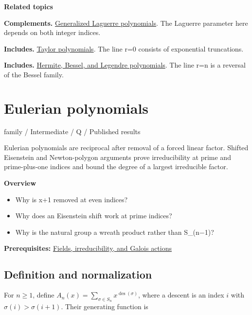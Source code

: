 \documentclass[11pt,a4paper,oneside,openany]{book}
\begin{document}
\par\medskip\begingroup\footnotesize\setlength{\parskip}{1pt}\textbf{\sffamily\color{atlasgreen}Related topics}\par
\color{black}\textbf{Complements.} \hyperlink{article:laguerre}{Generalized Laguerre polynomials}. The Laguerre parameter here depends on both integer indices.\par
\color{black}\textbf{Includes.} \hyperlink{article:taylor}{Taylor polynomials}. The line r=0 consists of exponential truncations.\par
\color{black}\textbf{Includes.} \hyperlink{article:orthogonal-families}{Hermite, Bessel, and Legendre polynomials}. The line r=n is a reversal of the Bessel family.\par
\endgroup
\chapter{Eulerian polynomials}\label{article:eulerian}\hypertarget{article:eulerian}{}\color{black}
{\sffamily\small\color{atlasgold}family / Intermediate / Q / Published results}\par\medskip
Eulerian polynomials are reciprocal after removal of a forced linear factor. Shifted Eisenstein and Newton-polygon arguments prove irreducibility at prime and prime-plus-one indices and bound the degree of a largest irreducible factor.\par\medskip
\textbf{Overview}\begin{itemize}
\item Why is x+1 removed at even indices?
\item Why does an Eisenstein shift work at prime indices?
\item Why is the natural group a wreath product rather than S\_\allowbreak{}(n\ensuremath{-}1)?
\end{itemize}
{\small\textbf{Prerequisites:} \hyperlink{article:foundations}{Fields, irreducibility, and Galois actions}}\par
{}\section{Definition and normalization}
\color{black} For \(n\ge1\), define \(A_n(x)=\sum_{\sigma\in S_n}x^{\operatorname{des}(\sigma)}\), where a descent is an index \(i\) with \(\sigma(i)>\sigma(i+1)\). Their generating function is\par
\end{document}
